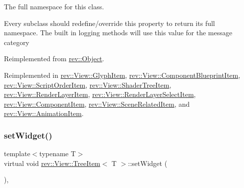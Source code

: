 The full namespace for this class. 

Every subclass should redefine/override this property to return its full namespace. The built in logging methods will use this value for the message category 

Reimplemented from \mbox{\hyperlink{classrev_1_1_object_aaeb638d3e10f361c56c211a318a27f3d}{rev\+::\+Object}}.



Reimplemented in \mbox{\hyperlink{classrev_1_1_view_1_1_glyph_item_a8fa3b57d04a71e8d5f9eb7593c7d2f0f}{rev\+::\+View\+::\+Glyph\+Item}}, \mbox{\hyperlink{classrev_1_1_view_1_1_component_blueprint_item_a0b0ed2cacce8cc3e1d7cc7ac14ca3c6f}{rev\+::\+View\+::\+Component\+Blueprint\+Item}}, \mbox{\hyperlink{classrev_1_1_view_1_1_script_order_item_a1ac64a1d792c531644e8acea2385effd}{rev\+::\+View\+::\+Script\+Order\+Item}}, \mbox{\hyperlink{classrev_1_1_view_1_1_shader_tree_item_a684fab698c34ef0456cb86ec590b6385}{rev\+::\+View\+::\+Shader\+Tree\+Item}}, \mbox{\hyperlink{classrev_1_1_view_1_1_render_layer_item_a2b0a9658af4c9bcd14703e39d3917813}{rev\+::\+View\+::\+Render\+Layer\+Item}}, \mbox{\hyperlink{classrev_1_1_view_1_1_render_layer_select_item_a2d8ca1314c2b66567c2e9de8bd717f4f}{rev\+::\+View\+::\+Render\+Layer\+Select\+Item}}, \mbox{\hyperlink{classrev_1_1_view_1_1_component_item_a75651a2035c376c2fa679eb614b430a3}{rev\+::\+View\+::\+Component\+Item}}, \mbox{\hyperlink{classrev_1_1_view_1_1_scene_related_item_a627f509d311402581f9fafadd2e7e014}{rev\+::\+View\+::\+Scene\+Related\+Item}}, and \mbox{\hyperlink{classrev_1_1_view_1_1_animation_item_a249007fb87aec92b8fc569d3bde45793}{rev\+::\+View\+::\+Animation\+Item}}.

\mbox{\label{classrev_1_1_view_1_1_tree_item_a24faa4e374ec0728c7eda8f50ca575df}} 
\subsubsection{\texorpdfstring{setWidget()}{setWidget()}}
{\footnotesize\ttfamily template$<$typename T$>$ \\
virtual void \mbox{\hyperlink{classrev_1_1_view_1_1_tree_item}{rev\+::\+View\+::\+Tree\+Item}}$<$ T $>$\+::set\+Widget (\begin{DoxyParamCaption}{ }\end{DoxyParamCaption})\hspace{0.3cm}{\ttfamily [inline]}, {\ttfamily [virtual]}}



